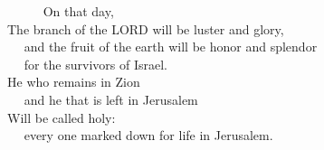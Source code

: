 
\lettrine{ }{}     On that day,\\
The branch of the LORD will be luster and glory,\\
   and the fruit of the earth will be honor and splendor\\
   for the survivors of Israel.\\
He who remains in Zion\\
   and he that is left in Jerusalem\\
Will be called holy:\\
   every one marked down for life in Jerusalem.